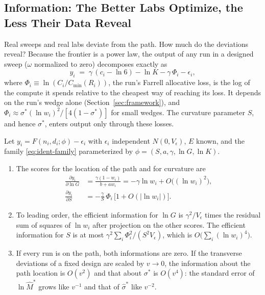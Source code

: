 \subsection{Information: The Better Labs Optimize, the Less Their Data Reveal}\label{sec:ident-info}

Real sweeps and real labs deviate from the path. How much do the deviations reveal? Because the frontier is a power
law, the output of any run in a designed sweep ($\omega$ normalized to zero) decomposes exactly as
\begin{equation}\label{eq:ident-decomp}
y_i \;=\; \gamma\,(c_i-\ln6)-\ln K-\gamma\,\Phi_i-\epsilon_i,
\end{equation}
where $\Phi_i\equiv\ln(C_i/C_{\min}(R_i))$, the run's Farrell allocative loss, is the log of the compute it spends
relative to the cheapest way of reaching its loss. It depends on the run's wedge alone (Section~\ref{sec:framework}), and
$\Phi_i\approx\sigma^*(\ln w_i)^2/[4(1-\sigma^*)]$ for small wedges. The curvature parameter $S$, and
hence $\sigma^*$, enters output only through these losses.

\begin{proposition}[Information]\label{prop:info}
Let $y_i=F(n_i,d_i;\phi)-\epsilon_i$ with $\epsilon_i$ independent $N(0,V_\epsilon)$, $E$ known, and the family
\eqref{eq:ident-family} parameterized by $\phi=(S,a,\gamma,\ln G,\ln K)$.
\begin{enumerate}
\item[(i)] The scores for the location of the path and for curvature are
\begin{align*}
\frac{\partial y_i}{\partial\ln G}&=\frac{\gamma(1-w_i)}{b+aw_i}=-\gamma\ln w_i+O\big((\ln w_i)^2\big),\\
\frac{\partial y_i}{\partial S}&=-\frac{\gamma}{S}\,\Phi_i\,\big[1+O(|\ln w_i|)\big].
\end{align*}
\item[(ii)] To leading order, the efficient information for $\ln G$ is $\gamma^2/V_\epsilon$ times the residual sum of
squares of $\ln w_i$ after projection on the other scores. The efficient information for $S$ is at most
$\gamma^2\sum_i\Phi_i^2/(S^2V_\epsilon)$, which is $O\big(\sum_i(\ln w_i)^4\big)$.
\item[(iii)] If every run is on the path, both informations are zero. If the transverse deviations of a fixed design
are scaled by $v\to0$, the information about the path location is $O(v^2)$ and that about $\sigma^*$ is $O(v^4)$: the
standard error of $\ln\hat M^*$ grows like $v^{-1}$ and that of $\hat\sigma^*$ like $v^{-2}$.
\end{enumerate}
\end{proposition}

